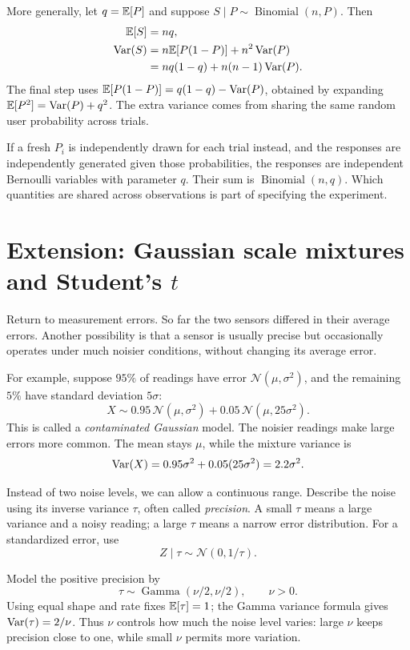 More generally, let \(q=\mathbb{E}[P]\) and suppose
\(S\mid P\sim\operatorname{Binomial}(n,P)\). Then
\begin{align*}
  \mathbb{E}[S]&=nq,\\
  \operatorname{Var}(S)
    &=n\mathbb{E}[P(1-P)]+n^2\operatorname{Var}(P)\\
    &=nq(1-q)+n(n-1)\operatorname{Var}(P).
\end{align*}
The final step uses
\(\mathbb{E}[P(1-P)]=q(1-q)-\operatorname{Var}(P)\), obtained by expanding
\(\mathbb{E}[P^2]=\operatorname{Var}(P)+q^2\).
The extra variance comes from sharing the same random user probability
across trials.

If a fresh \(P_i\) is independently drawn for each trial instead, and the
responses are independently generated given those probabilities, the
responses are independent Bernoulli variables with parameter \(q\).
Their sum is \(\operatorname{Binomial}(n,q)\).
Which quantities are shared across observations is part of specifying
the experiment.

\section{Extension: Gaussian scale mixtures and Student's \texorpdfstring{\(t\)}{t}}
\label{sec:student}

Return to measurement errors. So far the two sensors differed in their
average errors. Another possibility is that a sensor is usually precise
but occasionally operates under much noisier conditions, without changing
its average error.

For example, suppose \(95\%\) of readings have error
\(\mathcal N(\mu,\sigma^2)\), and the remaining \(5\%\) have standard
deviation \(5\sigma\):
\[
  X\sim0.95\,\mathcal N(\mu,\sigma^2)
      +0.05\,\mathcal N(\mu,25\sigma^2).
\]
This is called a \emph{contaminated Gaussian} model.
The noisier readings make large errors more common. The mean stays
\(\mu\), while the mixture variance is
\[
  \operatorname{Var}(X)=0.95\sigma^2+0.05(25\sigma^2)=2.2\sigma^2.
\]

Instead of two noise levels, we can allow a continuous range.
Describe the noise using its inverse variance \(\tau\), often called
\emph{precision}. A small \(\tau\) means a large variance and a noisy
reading; a large \(\tau\) means a narrow error distribution.
For a standardized error, use
\[
  Z\mid\tau\sim\mathcal N(0,1/\tau).
\]

Model the positive precision by
\[
  \tau\sim\operatorname{Gamma}(\nu/2,\nu/2),\qquad \nu>0.
\]
Using equal shape and rate fixes \(\mathbb{E}[\tau]=1\);
the Gamma variance formula gives \(\operatorname{Var}(\tau)=2/\nu\).
Thus \(\nu\) controls how much the noise level varies: large \(\nu\)
keeps precision close to one, while small \(\nu\) permits more variation.

